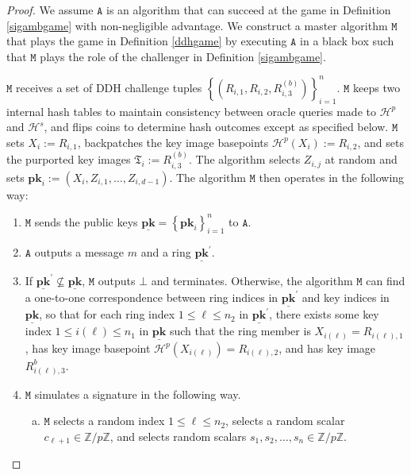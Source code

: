 \documentclass{article}
\theoremstyle{plain}
\theoremstyle{definition}
\begin{document}
\begin{proof}
We assume $\texttt{A}$ is an algorithm that can succeed at the game in Definition \ref{sigambgame} with non-negligible advantage. We construct a master algorithm $\texttt{M}$ that plays the game in Definition \ref{ddhgame} by executing $\texttt{A}$ in a black box such that $\texttt{M}$ plays the role of the challenger in Definition \ref{sigambgame}. 

$\texttt{M}$ receives a set of DDH challenge tuples $\left\{(R_{i,1}, R_{i,2}, R_{i,3}^{(b)})\right\}_{i=1}^{n}$. $\texttt{M}$ keeps two internal hash tables to maintain consistency between oracle queries made to $\mathcal{H}^p$ and $\mathcal{H}^s$, and flips coins to determine hash outcomes except as specified below. $\texttt{M}$ sets $X_i := R_{i,1}$, backpatches the key image basepoints $\mathcal{H}^p(X_i) := R_{i,2}$, and sets the purported key images $\mathfrak{T}_i := R_{i,3}^{(b)}$. The algorithm selects $Z_{i,j}$ at random and sets $\textbf{pk}_i := (X_i, Z_{i,1}, \ldots, Z_{i,d-1})$. The algorithm $\texttt{M}$ then operates in the following way:
\begin{enumerate}
\item $\texttt{M}$ sends the public keys $\underline{\textbf{pk}} = \left\{\textbf{pk}_i\right\}_{i=1}^{n}$ to $\texttt{A}$. 

\item $\texttt{A}$ outputs a message $m$ and a ring $\underline{\textbf{pk}}^\prime$. 

\item If $\underline{\textbf{pk}}^\prime \not\subseteq \underline{\textbf{pk}}$, $\texttt{M}$ outputs $\bot$ and terminates. Otherwise, the algorithm $\texttt{M}$ can find a one-to-one correspondence between ring indices in $\underline{\textbf{pk}}^\prime$ and key indices in $\underline{\textbf{pk}}$, so that for each ring index $1 \leq \ell \leq n_2$ in $\underline{\textbf{pk}}^\prime$, there exists some key index $1 \leq i(\ell) \leq n_1$ in $\underline{\textbf{pk}}$ such that the ring member is $X_{i(\ell)} = R_{i(\ell),1}$, has key image basepoint $\mathcal{H}^p(X_{i(\ell)}) = R_{i(\ell),2}$, and has key image $R_{i(\ell),3}^b$. 

\item $\texttt{M}$ simulates a signature in the following way.
\begin{enumerate}[(a)]
\item $\texttt{M}$ selects a random index $1 \leq \ell \leq n_2$, selects a random scalar $c_{\ell+1} \in \mathbb{Z}/p\mathbb{Z}$, and selects random scalars $s_1, s_2, \ldots, s_n \in \mathbb{Z}/p\mathbb{Z}$.


\end{enumerate}
\end{enumerate}
\end{proof}
\end{document}
